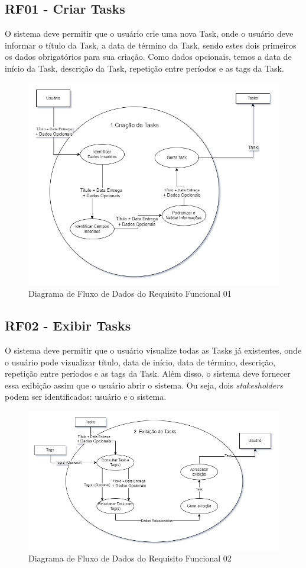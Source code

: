 \documentclass[a4paper,12pt]{article}
\begin{document}
\pagebreak
\subsection{RF01 - Criar Tasks}
O sistema deve permitir que o usuário crie uma nova {Task}, onde o usuário deve informar o título da {Task}, a data 
de término da {Task}, sendo estes dois primeiros os dados obrigatórios para sua criação. Como dados opcionais, temos a 
data de início da {Task}, descrição da {Task}, repetição entre períodos e as tags da {Task}.
\begin{figure}[H]
	\centering
	\includegraphics[scale=0.45]{DFDs/RF01.drawio.png}
	\caption{Diagrama de Fluxo de Dados do Requisito Funcional 01}
\end{figure}

\pagebreak
\subsection{RF02 - Exibir Tasks}
O sistema deve permitir que o usuário visualize todas as {Tasks} já existentes, onde o usuário pode vizualizar 
título, data de início, data de término, descrição, repetição entre períodos e as tags da {Task}. Além disso, o 
sistema deve fornecer essa exibição assim que o usuário abrir o sistema. Ou seja, dois \textit{stakesholders} 
podem ser identificados: usuário e o sistema.
\begin{figure}[H]
	\centering
	\includegraphics[scale=0.45]{DFDs/RF02.drawio.png}
	\caption{Diagrama de Fluxo de Dados do Requisito Funcional 02}
\end{figure}
\end{document}
